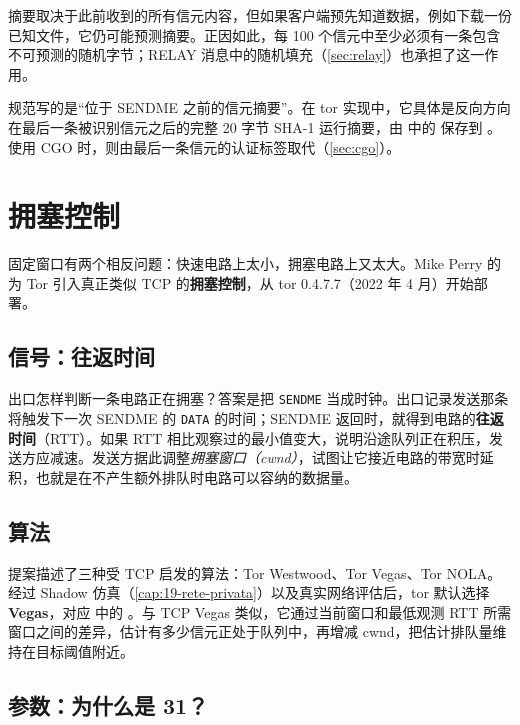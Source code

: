 摘要取决于此前收到的所有信元内容，但如果客户端预先知道数据，例如下载一份已知文件，它仍可能预测摘要。正因如此，每 100 个信元中至少必须有一条包含不可预测的随机字节；RELAY 消息中的随机填充（\cref{sec:relay}）也承担了这一作用。

\begin{approfondimento}[究竟是哪一个摘要？]
规范写的是\enquote{位于 SENDME 之前的信元摘要}。在 tor 实现中，它具体是反向方向在最后一条被识别信元之后的完整 20 字节 SHA-1 运行摘要，由  中的  保存到 。使用 CGO 时，则由最后一条信元的认证标签取代（\cref{sec:cgo}）。
\end{approfondimento}

\section{拥塞控制}\label{sec:cc}

固定窗口有两个相反问题：快速电路上太小，拥塞电路上又太大。Mike Perry 的  为 Tor 引入真正类似 TCP 的\textbf{拥塞控制}，从 tor 0.4.7.7（2022 年 4 月）开始部署。

\subsection{信号：往返时间}

出口怎样判断一条电路正在拥塞？答案是把 \texttt{SENDME} 当成时钟。出口记录发送那条将触发下一次 SENDME 的 \texttt{DATA} 的时间；SENDME 返回时，就得到电路的\textbf{往返时间}（RTT）。如果 RTT 相比观察过的最小值变大，说明沿途队列正在积压，发送方应减速。发送方据此调整\emph{拥塞窗口（cwnd）}，试图让它接近电路的带宽时延积，也就是在不产生额外排队时电路可以容纳的数据量。

\subsection{算法}

提案描述了三种受 TCP 启发的算法：Tor Westwood、Tor Vegas、Tor NOLA。经过 Shadow 仿真（\cref{cap:19-rete-privata}）以及真实网络评估后，tor 默认选择\textbf{Vegas}，对应  中的 。与 TCP Vegas 类似，它通过当前窗口和最低观测 RTT 所需窗口之间的差异，估计有多少信元正处于队列中，再增减 cwnd，把估计排队量维持在目标阈值附近。

\subsection{参数：为什么是 31？}

